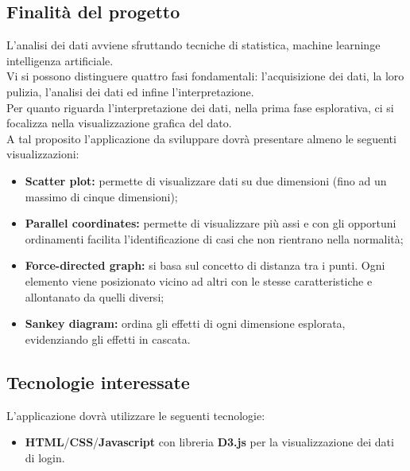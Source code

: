 \subsection{Finalità del progetto}
    L’analisi dei dati avviene sfruttando tecniche di statistica, machine learning\glo e intelligenza artificiale\glo.\\
    Vi si possono distinguere quattro fasi fondamentali: l'acquisizione dei dati, la loro pulizia, l'analisi dei dati ed infine l'interpretazione.\\
    Per quanto riguarda l'interpretazione dei dati, nella prima fase esplorativa, ci si focalizza nella visualizzazione grafica del dato.\\
    A tal proposito l'applicazione da sviluppare dovrà presentare almeno le seguenti visualizzazioni:
    \begin {itemize}
        \item \textbf{Scatter plot:} permette di visualizzare dati su due dimensioni (fino ad un massimo di cinque dimensioni);
        \item \textbf{Parallel coordinates:} permette di visualizzare più assi e con gli opportuni ordinamenti facilita l’identificazione di casi che non rientrano nella normalità;
        \item \textbf{Force-directed graph:} si basa sul concetto di distanza tra i punti. Ogni elemento viene posizionato vicino ad altri con le stesse caratteristiche e allontanato da quelli diversi;
        \item \textbf{Sankey diagram:} ordina gli effetti di ogni dimensione esplorata, evidenziando gli effetti in cascata.
    \end {itemize}

\subsection {Tecnologie interessate}
    L'applicazione dovrà utilizzare le seguenti tecnologie:
    \begin {itemize}
        \item \textbf{HTML\glo}/\textbf{CSS\glo}/\textbf{Javascript\glo} con libreria \textbf{D3.js\glo} per la visualizzazione dei dati di login.
    \end {itemize}

